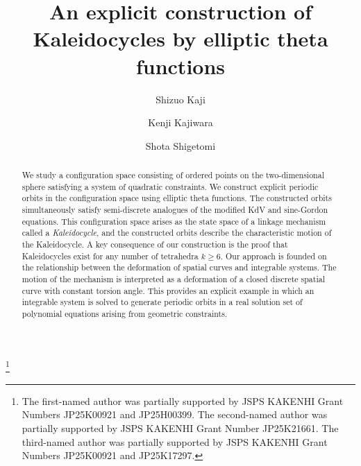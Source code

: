\documentclass[10pt,leqno]{amsart}
\numberwithin{equation}{section}
\begin{document}
\title[An explicit construction of Kaleidocycles]
 {An explicit construction of Kaleidocycles by elliptic theta functions} 

 \author{Shizuo Kaji}
 \address{Institute of Mathematics for Industry, Kyushu University, Fukuoka, Japan}
 \address{Graduate School of Science, Kyoto University, Kyoto, Japan}

 \author{Kenji Kajiwara}
 \address{Institute of Mathematics for Industry, Kyushu University, Fukuoka, Japan}

 \author{Shota Shigetomi}
 \address{Institute of Mathematics for Industry, Kyushu University, Fukuoka, Japan}

 \thanks{
 The first-named author was 
 partially supported by JSPS KAKENHI Grant Numbers JP25K00921 and JP25H00399.
 The second-named author was partially supported by JSPS KAKENHI Grant Number JP25K21661.
 The third-named author was partially supported by JSPS KAKENHI Grant Numbers JP25K00921 and JP25K17297.
 }




\begin{abstract}
We study a configuration space consisting of ordered points on the two-dimensional sphere satisfying a system of quadratic constraints.
We construct explicit periodic orbits in the configuration space using elliptic theta functions.
The constructed orbits simultaneously satisfy semi-discrete analogues of the modified KdV and sine-Gordon equations.
This configuration space arises as the state space of a linkage mechanism called a \emph{Kaleidocycle}, and the constructed orbits describe the characteristic motion of the Kaleidocycle. A key consequence of our construction is the proof that Kaleidocycles exist for any number of tetrahedra $k \ge 6$.
Our approach is founded on the relationship between the deformation of spatial curves and integrable systems.
The motion of the mechanism is interpreted as a deformation of a closed discrete spatial curve with constant torsion angle.
This provides an explicit example in which an integrable system is solved to generate periodic orbits in a real solution set of polynomial equations arising from geometric constraints.
\end{abstract}
\end{document}
